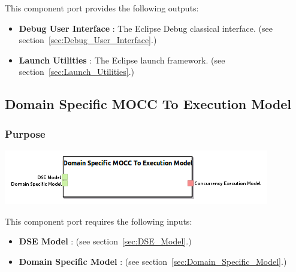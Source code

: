 \documentclass{gemoc} %
\begin{document}
This component port provides the following outputs:
\begin{itemize}
  \item \textbf{Debug User Interface} :
The Eclipse Debug classical interface.
(see section~\ref{sec:Debug_User_Interface}.)
  \item \textbf{Launch Utilities} :
The Eclipse launch framework.
(see section~\ref{sec:Launch_Utilities}.)
\end{itemize}


\subsection{Domain Specific MOCC To Execution Model}
\label{sec:Domain_Specific_MOCC_To_Execution_Model}


\subsubsection{Purpose}


\begin{center}
\includegraphics*[trim=0.0cm 0.0cm 0cm 0.0cm, clip=true]{../images/generated/Generated_Domain_Specific_MOCC_To_Execution_Model.png}
\end{center}

This component port requires the following inputs:
\begin{itemize}
  \item \textbf{DSE Model} :
(see section~\ref{sec:DSE_Model}.)
  \item \textbf{Domain Specific Model} :
(see section~\ref{sec:Domain_Specific_Model}.)
\end{itemize}
\end{document}
